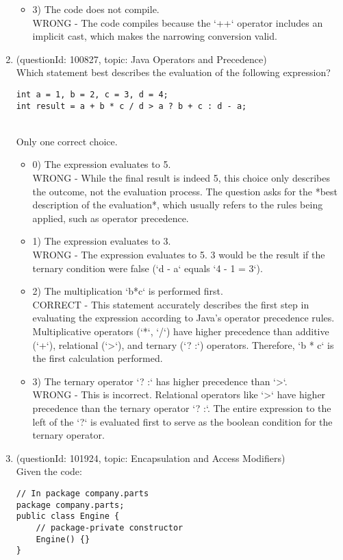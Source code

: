 \documentclass[12pt]{article}
\begin{document}
\begin{enumerate}[label=(\arabic*)]
\begin{itemize}
\item 3) The code does not compile.
 \\ 
WRONG - The code compiles because the `++` operator includes an implicit cast, which makes the narrowing conversion valid.

\end{itemize}
\item (questionId: 100827, topic: Java Operators and Precedence) \\ 
Which statement best describes the evaluation of the following expression?\n\begin{verbatim}
int a = 1, b = 2, c = 3, d = 4;
int result = a + b * c / d > a ? b + c : d - a;
\end{verbatim}
\\ \noindent Only one correct choice. 
\begin{itemize}
\item 0) The expression evaluates to 5.
 \\ 
WRONG - While the final result is indeed 5, this choice only describes the outcome, not the evaluation process. The question asks for the *best description of the evaluation*, which usually refers to the rules being applied, such as operator precedence.

\item 1) The expression evaluates to 3.
 \\ 
WRONG - The expression evaluates to 5. 3 would be the result if the ternary condition were false (`d - a` equals `4 - 1 = 3`).

\item 2) The multiplication `b*c` is performed first.
 \\ 
CORRECT - This statement accurately describes the first step in evaluating the expression according to Java's operator precedence rules. Multiplicative operators (`*`, `/`) have higher precedence than additive (`+`), relational (`>`), and ternary (`? :`) operators. Therefore, `b * c` is the first calculation performed.

\item 3) The ternary operator `? :` has higher precedence than `>`.
 \\ 
WRONG - This is incorrect. Relational operators like `>` have higher precedence than the ternary operator `? :`. The entire expression to the left of the `?` is evaluated first to serve as the boolean condition for the ternary operator.

\end{itemize}
\item (questionId: 101924, topic: Encapsulation and Access Modifiers) \\ 
Given the code:
\begin{verbatim}
// In package company.parts
package company.parts;
public class Engine {
    // package-private constructor
    Engine() {}
}


\end{verbatim}
\end{enumerate}
\end{document}
